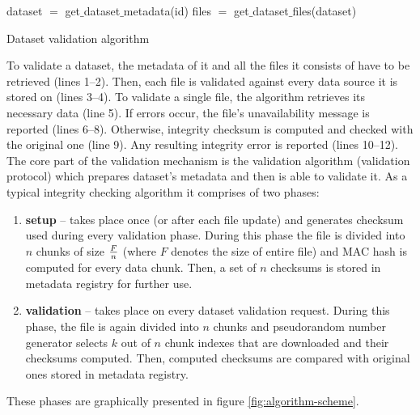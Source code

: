 \begin{algorithm}[H]
	\SetLine
	\linesnumbered
	dataset $=$ get$\_$dataset$\_$metadata(id)\;
	files $=$ get$\_$dataset$\_$files(dataset)\;
\caption{Dataset validation algorithm}
\end{algorithm}

To validate a dataset, the metadata of it and all the files it consists of
have to be retrieved (lines 1--2). Then, each file is validated against every
data source it is stored on (lines 3--4). To validate a single file, the
algorithm retrieves its necessary data (line 5). If errors occur, the file's
unavailability message is reported (lines 6--8). Otherwise, integrity checksum
is computed and checked with the original one (line 9). Any resulting integrity
error is reported (lines 10--12).\\

The core part of the validation mechanism is the validation algorithm
(validation protocol) which prepares dataset's metadata and then is able to
validate it. As a typical integrity checking algorithm it comprises of two 
phases: 

\begin{enumerate}
	\item \textbf{setup} -- takes place once (or after each file update) and 
	generates checksum used during every validation phase. During this
	phase the file is divided into $n$ chunks of size $F \over n$ (where $F$
	denotes the size of entire file) and MAC hash is computed for every data
	chunk. Then, a set of $n$ checksums is stored in metadata registry for
	further use.
	\item \textbf{validation} -- takes place on every dataset validation 
	request. During this phase, the file is again divided into $n$ chunks and
	pseudorandom number generator selects $k$ out of $n$ chunk indexes that are
	downloaded and their checksums computed. Then, computed checksums are
	compared with original ones stored in metadata registry.
\end{enumerate}

These phases are graphically presented in figure \ref{fig:algorithm-scheme}.\\

